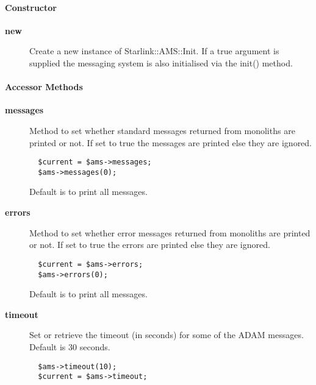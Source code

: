 \begin{description}
\begin{description}
\paragraph*{Constructor\label{ORAC::Msg::Control::AMS_Constructor}}
\begin{description}

\item[{\textbf{new}}] \mbox{}

Create a new instance of Starlink::AMS::Init.
If a true argument is supplied the messaging system is also
initialised via the init() method.

\end{description}
\paragraph*{Accessor Methods\label{ORAC::Msg::Control::AMS_Accessor_Methods}}
\begin{description}

\item[{\textbf{messages}}] \mbox{}

Method to set whether standard messages returned from monoliths
are printed or not. If set to true the messages are printed
else they are ignored.

\begin{verbatim}
  $current = $ams->messages;
  $ams->messages(0);
\end{verbatim}


Default is to print all messages.


\item[{\textbf{errors}}] \mbox{}

Method to set whether error messages returned from monoliths
are printed or not. If set to true the errors are printed
else they are ignored.

\begin{verbatim}
  $current = $ams->errors;
  $ams->errors(0);
\end{verbatim}


Default is to print all messages.


\item[{\textbf{timeout}}] \mbox{}

Set or retrieve the timeout (in seconds) for some of the ADAM messages.
Default is 30 seconds.

\begin{verbatim}
  $ams->timeout(10);
  $current = $ams->timeout;
\end{verbatim}


\end{description}
\end{description}
\end{description}
